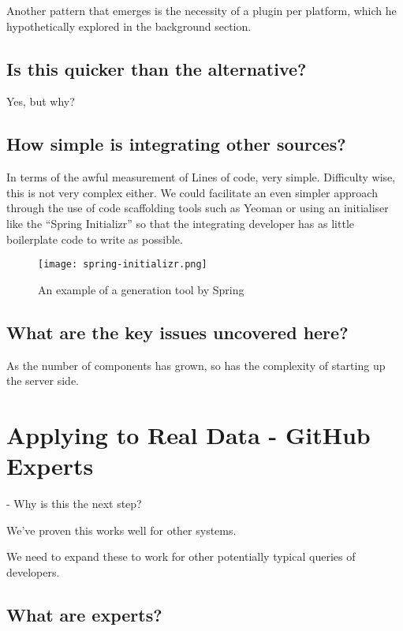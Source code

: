 Another pattern that emerges is the necessity of a plugin per platform, which he hypothetically explored in the background section.

\subsection{Is this quicker than the alternative?}

Yes, but why?

\subsection{How simple is integrating other sources?}

In terms of the awful measurement of Lines of code, very simple. Difficulty wise, this is not very complex either. We could facilitate an even simpler approach through the use of code scaffolding tools such as Yeoman or using an initialiser like the ``Spring Initializr'' so that the integrating developer has as little boilerplate code to write as possible.

\begin{figure}[h!]
	\centering
	\texttt{[image: spring-initializr.png]}
	\label{fig:springExample}
	\caption{An example of a generation tool by Spring}
\end{figure}

\subsection{What are the key issues uncovered here?}

As the number of components has grown, so has the complexity of starting up the server side.

\section{Applying to Real Data - GitHub Experts}

- Why is this the next step?

We've proven this works well for other systems.

We need to expand these to work for other potentially typical queries of developers.


\subsection{What are experts?}

